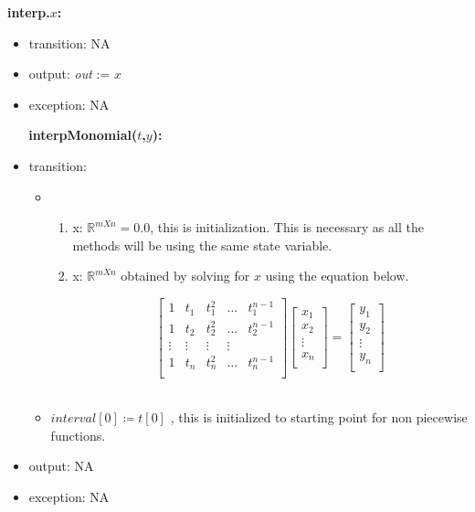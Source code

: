 \documentclass[12pt, titlepage]{article}
\begin{document}
\noindent \textbf{interp.$x$:}
\begin{itemize}
	\item transition: NA	
	\item output: \textit{out} := $x$
	\item exception: NA
\end{itemize}
~\newline
~\newline
\noindent \textbf{interpMonomial($t$,$y$):}
\begin{itemize}
\item transition: 
\begin{itemize}
	\item 
	\begin{enumerate}
	\item x: $\mathbb{R}^{m X n} = 0.0 $, this is initialization. This is 
	necessary as all the methods will be using the same state variable.
	
	\item x: $\mathbb{R}^{m X n}$ obtained by solving for $x$ using the 
	equation below.
	
	\begin{equation*}
	\begin{bmatrix}
	1 & t_{1} & t_{1} ^2 & \dots & t_{1} ^{n-1} \\
	1 & t_{2} & t_{2} ^2 & \dots & t_{2} ^{n-1} \\
	\vdots & \vdots & \vdots & \vdots \\
	1 & t_{n} & t_{n} ^2 & \dots & t_{n} ^{n-1} \\
	\end{bmatrix}
	\begin{bmatrix}
	x_1  \\
	x_2 \\
	\vdots \\
	x_n \\
	\end{bmatrix} = 
	\begin{bmatrix}
	y_1  \\
	y_2 \\
	\vdots \\
	y_n \\
	\end{bmatrix}
	\end{equation*}\\
	\end{enumerate}
	\item $interval[0] \coloneqq t[0] $ , this is initialized to 
	starting point for non piecewise functions.
\end{itemize}
  
\item output: NA
 
\item exception: NA
\end{itemize}
\end{document}
